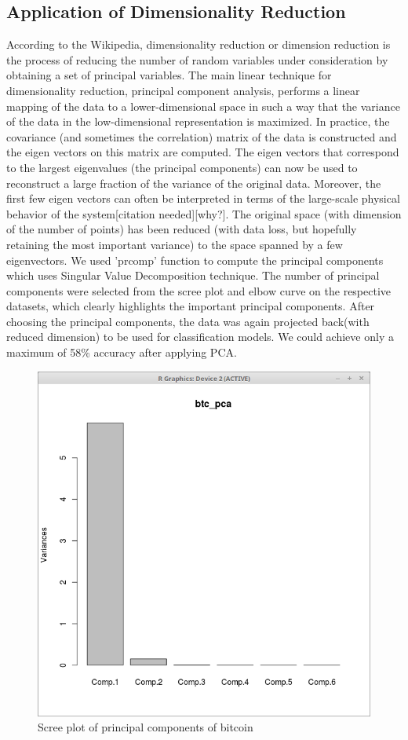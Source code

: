 \documentclass{article}
\begin{document}
\subsection{Application of Dimensionality Reduction}
According to the Wikipedia, dimensionality reduction or dimension reduction is the process of reducing the number of random variables under consideration by obtaining a set of principal variables. The main linear technique for dimensionality reduction, principal component analysis, performs a linear mapping of the data to a lower-dimensional space in such a way that the variance of the data in the low-dimensional representation is maximized. In practice, the covariance (and sometimes the correlation) matrix of the data is constructed and the eigen vectors on this matrix are computed. The eigen vectors that correspond to the largest eigenvalues (the principal components) can now be used to reconstruct a large fraction of the variance of the original data. Moreover, the first few eigen vectors can often be interpreted in terms of the large-scale physical behavior of the system[citation needed][why?]. The original space (with dimension of the number of points) has been reduced (with data loss, but hopefully retaining the most important variance) to the space spanned by a few eigenvectors.
We used 'prcomp' function to compute the principal components which uses Singular Value Decomposition technique. The number of principal components were selected from the scree plot and elbow curve on the respective datasets, which clearly highlights the important principal components. After choosing the principal components, the data was again projected back(with reduced dimension) to be used for classification models. We could achieve only a maximum of 58\% accuracy after applying PCA.
\newpage

\begin{figure}[ht]
	\centering
	\includegraphics[width = 6 cm]{bitcoin_pca.png}
	\caption{Scree plot of principal components of bitcoin}
	\label{fig: btc_pca}
\end{figure}
\end{document}
